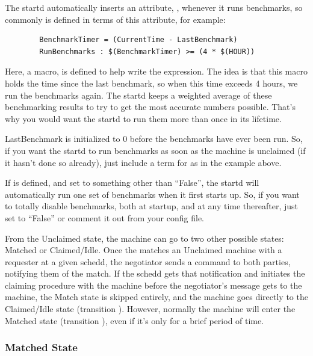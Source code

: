 The startd automatically inserts an attribute, ,
whenever it runs benchmarks, so commonly  is
defined in terms of this attribute, for example:
\begin{verbatim}
        BenchmarkTimer = (CurrentTime - LastBenchmark)
        RunBenchmarks : $(BenchmarkTimer) >= (4 * $(HOUR))
\end{verbatim}

Here, a macro,  is defined to help write the
expression.  The idea is that this macro holds the time since the last
benchmark, so when this time exceeds 4 hours, we run the benchmarks
again.  The startd keeps a weighted average of these benchmarking
results to try to get the most accurate numbers possible.  That's why
you would want the startd to run them more than once in its lifetime.

\Note LastBenchmark is initialized to 0 before the benchmarks
have ever been run.
So, if you want the startd to run benchmarks as soon as the machine is
unclaimed (if it hasn't done so already), just include a term for
 as in the example above.

\Note If  is defined, and set to something
other than ``False'', the startd will automatically run one set of
benchmarks when it first starts up.
So, if you want to totally disable benchmarks, both at startup, and at
any time thereafter, just set  to ``False'' or
comment it out from your config file.

From the Unclaimed state, the machine can go to two other possible
states: Matched or Claimed/Idle.
Once the  matches an Unclaimed machine with a
requester at a given schedd, the negotiator sends a command to both
parties, notifying them of the match.  
If the schedd gets that notification and initiates the claiming
procedure with the machine before the negotiator's message gets to the
machine, the Match state is skipped entirely, and the machine goes
directly to the Claimed/Idle state (transition ).
However, normally the machine will enter the Matched state (transition
), even if it's only for a brief period of time.

\subsubsection{Matched State}
\label{sec:Matched-State}

